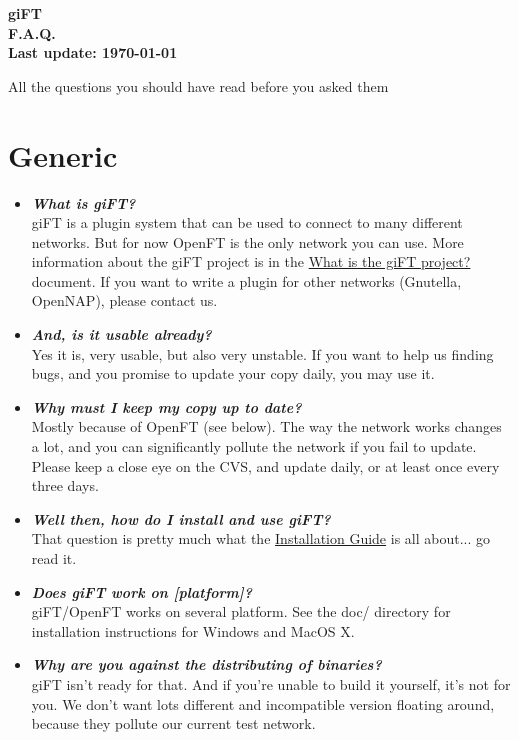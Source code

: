 \documentclass[10pt]{article}
\newcommand{\question}[1]{\item\textbf{\emph{#1}}}
\begin{document}
\begin{center}
\textsf{\textbf{\Huge{giFT} \\ \huge{F.A.Q.} \\
\normalsize{Last update: \today}}}
\end{center}

\begin{center}
All the questions you should have read before you asked them
\end{center}

\tableofcontents

\setlength{\parskip}{1.4ex}

\section{Generic}
\begin{itemize}

\question {What is giFT?}\\
giFT is a plugin system that can be used to connect to many
different networks.  But for now OpenFT is the only network you
can use. More information about the giFT project is in the
\href{http://gift.sourceforge.net/docs.php?document=whatis.html}{What
is the giFT project?} document. If you want to write a plugin for
other networks (Gnutella, OpenNAP), please contact us.

\question {And, is it usable already?}\\
Yes it is, very usable, but also very unstable. If you want to
help us finding bugs, and you promise to update your copy daily,
you may use it.

\question {Why must I keep my copy up to date?}\\
Mostly because of OpenFT (see below). The way the network works
changes a lot, and you can significantly pollute the network if
you fail to update. Please keep a close eye on the CVS, and update
daily, or at least once every three days.

\question {Well then, how do I install and use giFT?}\\
That question is pretty much what the
\href{http://gift.sourceforge.net/docs.php?document=install.html}{Installation
Guide} is all about... go read it.

\question {Does giFT work on [platform]?}\\
giFT/OpenFT works on several platform.  See the doc/ directory for
installation instructions for Windows and MacOS X.

\question {Why are you against the distributing of binaries?}\\
giFT isn't ready for that. And if you're unable to build it
yourself, it's not for you.  We don't want lots different and
incompatible version floating around, because they pollute our
current test network.


\end{itemize}
\end{document}

